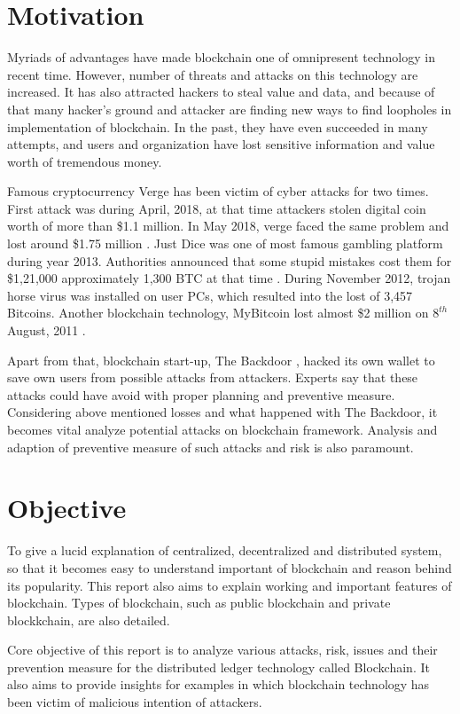 \documentclass[a4paper,twoside,12pt]{report}
\begin{document}
\begin{spacing}{1.5}
\section{Motivation}
Myriads of advantages have made blockchain one of omnipresent technology in recent time. However, number of threats and attacks on this technology are increased. It has also attracted hackers to steal value and data, and because of that many hacker's ground and attacker are finding new ways to find loopholes in implementation of blockchain. In the past, they have even succeeded in many attempts, and users and organization have lost sensitive information and value worth of tremendous money.
\par
Famous cryptocurrency Verge has been victim of cyber attacks for two times. First attack was during April, 2018, at that time attackers stolen digital coin worth of more than \$1.1 million. In May 2018, verge faced the same problem and lost around \$1.75 million \cite{verge_51_attack}. Just Dice was one of most famous gambling platform during year 2013. Authorities announced that some stupid mistakes cost them for \$1,21,000 approximately 1,300 BTC at that time \cite{all_bitcoin_scam}. During November 2012, trojan horse virus was installed on user PCs, which resulted into the lost of 3,457 Bitcoins. Another blockchain technology, MyBitcoin lost almost \$2 million on $8^{th}$ August, 2011 \cite{mybitcoin_hack}. 
\par
Apart from that, blockchain start-up, The Backdoor , hacked its own wallet to save own users from possible attacks from attackers. Experts say that these attacks could have avoid with proper planning and preventive measure. Considering above mentioned losses and what happened with The Backdoor, it becomes vital analyze potential attacks on blockchain framework. Analysis and adaption of preventive measure of such attacks and risk is also paramount. 

\section{Objective}
To give a lucid explanation of centralized, decentralized and distributed system, so that it becomes easy to understand important of blockchain and reason behind its popularity. This report also aims to explain working and important features of blockchain. Types of blockchain, such as public blockchain and private blockkchain, are also detailed.  

Core objective of this report is to analyze various attacks, risk, issues and their prevention measure for the distributed ledger technology called Blockchain. It also aims to provide insights for examples in which blockchain technology has been victim of malicious intention of attackers.

\end{spacing}
\end{document}
